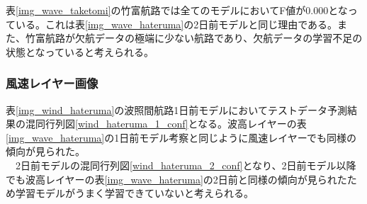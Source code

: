 表\ref{img_wave_taketomi}の竹富航路では全てのモデルにおいてF値が0.000となっている。これは表\ref{img_wave_hateruma}の2日前モデルと同じ理由である。また、竹富航路が欠航データの極端に少ない航路であり、欠航データの学習不足の状態となっていると考えられる。

\subsubsection{風速レイヤー画像}

表\ref{img_wind_hateruma}の波照間航路1日前モデルにおいてテストデータ予測結果の混同行列図\ref{wind_hateruma_1_conf}となる。波高レイヤーの表\ref{img_wave_hateruma}の1日前モデル考察と同じように風速レイヤーでも同様の傾向が見られた。
\\　2日前モデルの混同行列図\ref{wind_hateruma_2_conf}となり、2日前モデル以降でも波高レイヤーの表\ref{img_wave_hateruma}の2日前と同様の傾向が見られたため学習モデルがうまく学習できていないと考えられる。

